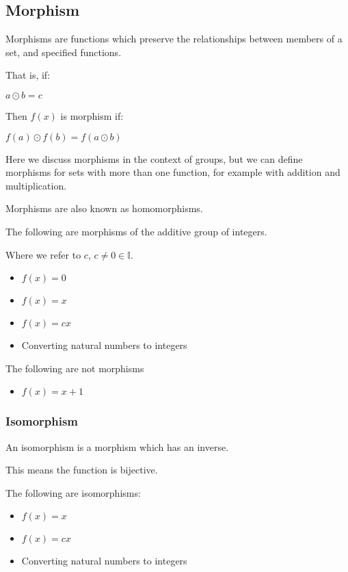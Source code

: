 
\subsection{Morphism}

Morphisms are functions which preserve the relationships between members of a set, and specified functions.

That is, if:

\(a\odot b=c\)

Then \(f(x)\) is morphism if:

\(f(a)\odot f(b)=f(a\odot b)\)

Here we discuss morphisms in the context of groups, but we can define morphisms for sets with more than one function, for example with addition and multiplication.

Morphisms are also known as homomorphisms.

The following are morphisms of the additive group of integers.

Where we refer to \(c\), \(c\ne 0\in \mathbb{I}\).

\begin{itemize}
\item \(f(x)=0\)
\item \(f(x)=x\)
\item \(f(x)=cx\)
\item Converting natural numbers to integers
\end{itemize}

The following are not morphisms

\begin{itemize}
\item \(f(x)=x+1\)
\end{itemize}


\subsubsection{Isomorphism}

An isomorphism is a morphism which has an inverse.

This means the function is bijective.

The following are isomorphisms:

\begin{itemize}
\item \(f(x)=x\)
\item \(f(x)=cx\)
\item Converting natural numbers to integers
\end{itemize}


